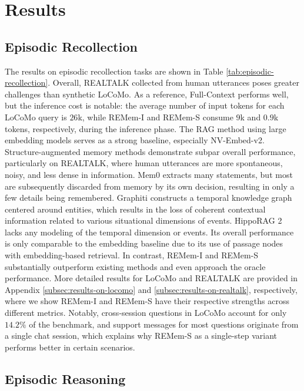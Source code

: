 \documentclass{article} %
\newcommand{\ours}{REMem\xspace}
\begin{document}
\section{Results}

\subsection{Episodic Recollection}


The results on episodic recollection tasks are shown in Table \ref{tab:episodic-recollection}.
Overall, REALTALK collected from human utterances poses greater challenges than synthetic LoCoMo.
As a reference, Full-Context performs well, but the inference cost is notable: the average number of input tokens for each LoCoMo query is $26$k, while \ours-I and \ours-S consume $9$k and $0.9$k tokens, respectively, during the inference phase.
The RAG method using large embedding models serves as a strong baseline, especially NV-Embed-v2.
Structure-augmented memory methods demonstrate subpar overall performance, particularly on REALTALK, where human utterances are more spontaneous, noisy, and less dense in information.
Mem0 extracts many statements, but most are subsequently discarded from memory by its own decision, resulting in only a few details being remembered.
Graphiti constructs a temporal knowledge graph centered around entities, which results in the loss of coherent contextual information related to various situational dimensions of events.
HippoRAG 2 lacks any modeling of the temporal dimension or events. 
Its overall performance is only comparable to the embedding baseline due to its use of passage nodes with embedding-based retrieval.
In contrast, \ours-I and \ours-S substantially outperform existing methods and even approach the oracle performance.
More detailed results for LoCoMo and REALTALK are provided in Appendix \ref{subsec:results-on-locomo} and \ref{subsec:results-on-realtalk}, respectively, where we show \ours-I and \ours-S have their respective strengths across different metrics. 
Notably, cross-session questions in LoCoMo account for only $14.2\%$ of the benchmark, and support messages for most questions originate from a single chat session, which explains why \ours-S as a single-step variant performs better in certain scenarios.


\subsection{Episodic Reasoning}
\label{subsec:episodic-reasoning}
\end{document}
